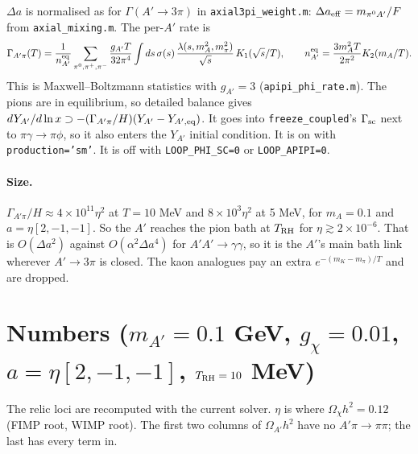 \documentclass{article}
\newcommand{\Da}{\Delta a}
\begin{document}
$\Da$ is normalised as for $\Gamma(A'\to3\pi)$ in \texttt{axial3pi\_weight.m}:
$\Da_{\rm eff}=m_{\pi^0A'}/F$ from \texttt{axial\_mixing.m}. The per-$A'$ rate is
\begin{equation}
\Gamma_{A'\pi}(T)=\frac{1}{n_{A'}^{\rm eq}}\sum_{\pi^0,\pi^+,\pi^-}\frac{g_{A'}T}{32\pi^4}\int ds\,
\sigma(s)\,\frac{\lambda(s,m_A^2,m_\pi^2)}{\sqrt s}\,K_1(\sqrt s/T),\qquad
n_{A'}^{\rm eq}=\frac{3m_A^2T}{2\pi^2}K_2(m_A/T).
\end{equation}
This is Maxwell--Boltzmann statistics with $g_{A'}=3$ (\texttt{apipi\_phi\_rate.m}). The pions
are in equilibrium, so detailed balance gives
$dY_{A'}/d\ln x\supset-(\Gamma_{A'\pi}/H)(Y_{A'}-Y_{A',\rm eq})$. It goes into
\texttt{freeze\_coupled}'s $\Gamma_{\rm sc}$ next to $\pi\gamma\to\pi\phi$, so it also enters the
$Y_{A'}$ initial condition. It is on with \texttt{production='sm'}. It is off with
\texttt{LOOP\_PHI\_SC=0} or \texttt{LOOP\_APIPI=0}.

\paragraph{Size.} $\Gamma_{A'\pi}/H\approx4\times10^{11}\eta^2$ at $T=10$ MeV and
$8\times10^{3}\eta^2$ at 5 MeV, for $m_A=0.1$ and $a=\eta[2,-1,-1]$. So the $A'$ reaches the pion
bath at $T_{\rm RH}$ for $\eta\gtrsim2\times10^{-6}$. That is $O(\Da^2)$ against
$O(\alpha^2\Da^4)$ for $A'A'\to\gamma\gamma$, so it is the $A'$'s main bath link wherever
$A'\to3\pi$ is closed. The kaon analogues pay an extra $e^{-(m_K-m_\pi)/T}$ and are dropped.

\section{Numbers ($m_{A'}=0.1$ GeV, $g_\chi=0.01$, $a=\eta[2,-1,-1]$, $T_{\rm RH}=10$ MeV)}

The relic loci are recomputed with the current solver. $\eta$ is where $\Omega_\chi h^2=0.12$
(FIMP root, WIMP root). The first two columns of $\Omega_{A'}h^2$ have no $A'\pi\to\pi\pi$; the
last has every term in.
\end{document}
